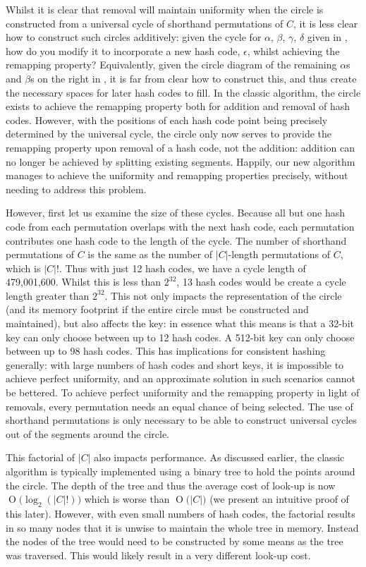 \documentclass[runningheads,a4paper]{llncs}
\newcommand{\BigO}[1]{\ensuremath{\operatorname{O}\bigl(#1\bigr)}}
\begin{document}
Whilst it is clear that removal will maintain uniformity when the
circle is constructed from a universal cycle of shorthand permutations
of $C$, it is less clear how to construct such circles additively:
given the cycle for $\alpha$, $\beta$, $\gamma$, $\delta$ given in
, how do you modify it to incorporate a new
hash code, $\epsilon$, whilst achieving the remapping property?
Equivalently, given the circle diagram of the remaining $\alpha$s and
$\beta$s on the right in , it is far
from clear how to construct this, and thus create the necessary spaces
for later hash codes to fill. In the classic algorithm, the circle
exists to achieve the remapping property both for addition and removal
of hash codes. However, with the positions of each hash code point
being precisely determined by the universal cycle, the circle only now
serves to provide the remapping property upon removal of a hash code,
not the addition: addition can no longer be achieved by splitting
existing segments. Happily, our new algorithm manages to achieve the
uniformity and remapping properties precisely, without needing to
address this problem.

However, first let us examine the size of these cycles. Because all
but one hash code from each permutation overlaps with the next hash
code, each permutation contributes one hash code to the length of the
cycle. The number of shorthand permutations of $C$ is the same as the
number of $|C|$-length permutations of $C$, which is $|C|!$. Thus with
just 12 hash codes, we have a cycle length of 479,001,600. Whilst this
is less than $2^{32}$, 13 hash codes would be create a cycle length
greater than $2^{32}$. This not only impacts the representation of the
circle (and its memory footprint if the entire circle must be
constructed and maintained), but also affects the key: in essence what
this means is that a 32-bit key can only choose between up to 12 hash
codes. A 512-bit key can only choose between up to 98 hash codes. This
has implications for consistent hashing generally: with large numbers
of hash codes and short keys, it is impossible to achieve perfect
uniformity, and an approximate solution in such scenarios cannot be
bettered. To achieve perfect uniformity and the remapping property in
light of removals, every permutation needs an equal chance of being
selected. The use of shorthand permutations is only necessary to be
able to construct universal cycles out of the segments around the
circle.

This factorial of $|C|$ also impacts performance. As discussed
earlier, the classic algorithm is typically implemented using a binary
tree to hold the points around the circle. The depth of the tree and
thus the average cost of look-up is now $\BigO{\log_2(|C|!)}$ which is
worse than $\BigO{|C|}$ (we present an intuitive proof of this
later). However, with even small numbers of hash codes, the factorial
results in so many nodes that it is unwise to maintain the whole tree
in memory. Instead the nodes of the tree would need to be constructed
by some means as the tree was traversed. This would likely result in a
very different look-up cost.
\end{document}
